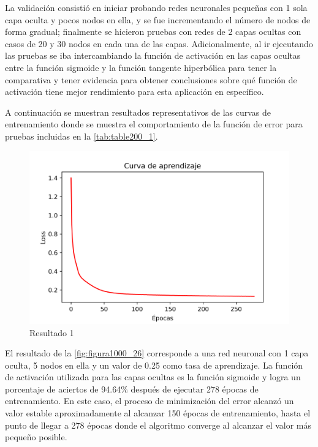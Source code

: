 La validación consistió en iniciar probando redes neuronales pequeñas con 1 sola capa oculta y pocos nodos en ella, y se fue incrementando el número de nodos de forma gradual; finalmente se hicieron pruebas con redes de 
2 capas ocultas con casos de 20 y 30 nodos en cada una de las capas. Adicionalmente, al ir ejecutando las pruebas se iba intercambiando la función de activación en las capas ocultas entre la función sigmoide y la función 
tangente hiperbólica para tener la comparativa y tener evidencia para obtener conclusiones sobre qué función de activación tiene mejor rendimiento para esta aplicación en específico.

A continuación se muestran resultados representativos de las curvas de entrenamiento donde se muestra el comportamiento de la función de error para pruebas incluidas en la \autoref{tab:table200_1}. 

\clearpage

\begin{figure}[h]
	\centering
	\includegraphics[scale=0.71]{imgss176.png}
	\caption{Resultado 1}
	\label{fig:figura1000_26}
\end{figure}

El resultado de la \autoref{fig:figura1000_26} corresponde a una red neuronal con 1 capa oculta, 5 nodos en ella y un valor de 0.25 como tasa de aprendizaje. La función de activación utilizada para las capas ocultas es la 
función sigmoide y logra un porcentaje de aciertos de 94.64$\%$ después de ejecutar 278 épocas de entrenamiento. En este caso, el proceso de minimización del error alcanzó un valor estable aproximadamente al alcanzar 
150 épocas de entrenamiento, hasta el punto de llegar a 278 épocas donde el algoritmo converge al alcanzar el valor más pequeño posible.

